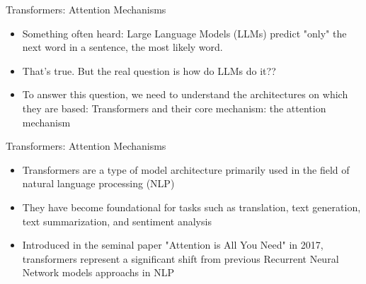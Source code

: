 \begin{frame}{Transformers: Attention Mechanisms}
  \begin{itemize}
      \item Something often heard: Large Language Models (LLMs) predict "only" the next word in a sentence, the most likely word.
      \item That's true. But the real question is how do LLMs do it??
      \item To answer this question, we need to understand the architectures on which they are based: Transformers and their core mechanism: the attention mechanism
  \end{itemize}
\end{frame}


\begin{frame}{Transformers: Attention Mechanisms}
    \begin{itemize}
        \item Transformers are a type of model architecture primarily used in the field of natural language processing (NLP)
        \item They have become foundational for tasks such as translation, text generation, text summarization, and sentiment analysis
        \item Introduced in the seminal paper "Attention is All You Need" in 2017, transformers represent a significant shift from previous Recurrent Neural Network models approachs in NLP
      \end{itemize}
\end{frame}

